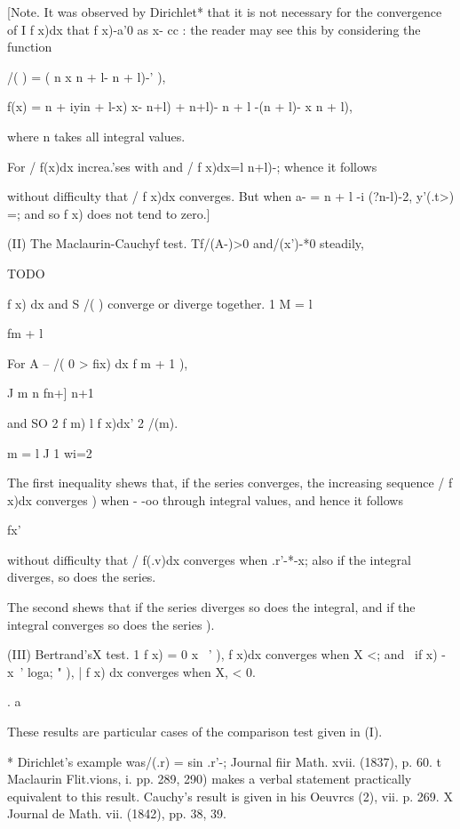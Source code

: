 [Note. It was observed by Dirichlet* that it is not necessary for the
convergence of I f x)dx that f x)-a'0 as x- cc : the reader may see
this by considering the function

/( ) = ( n x n + l- n + l)-' ),

f(x) = n + iyin + l-x) x- n+l) + n+l)- n + l -(n + l)- x n + l),

where n takes all integral values.

For / f(x)dx increa.'ses with and / f x)dx=l n+l)-; whence it follows

without difficulty that / f x)dx converges. But when a- = n + l -i
(?n-l)-2, y'(.t>) =; and so f x) does not tend to zero.]

(II) The Maclaurin-Cauchyf test. Tf/(A-)>0 and/(x')-*0 steadily,

TODO

f x) dx and S /( ) converge or diverge together. 1 M = l

fm + l

For A -- /( 0 > fix) dx f m + 1 ),

J m n fn+] n+1

and SO 2 f m) l f x)dx' 2 /(m).

  m = l J 1 wi=2

The first inequality shews that, if the series converges, the
increasing sequence / f x)dx converges ) when - -oo through
integral values, and hence it follows

fx'

without difficulty that / f(.v)dx converges when .r'-*-x; also if the
integral diverges, so does the series.

The second shews that if the series diverges so does the integral, and
if the integral converges so does the series ).

(III) Bertrand'sX test. 1 f x) = 0 x ~' ), f x)dx converges when X <;
and \ if x) - x~' loga; " ), | f x) dx converges when X, < 0.

. a

These results are particular cases of the comparison test given in
(I).

* Dirichlet's example was/(.r) = sin .r'-; Journal fiir Math. xvii.
(1837), p. 60. t Maclaurin Flit.vions, i. pp. 289, 290) makes a verbal
statement practically equivalent to this result. Cauchy's result is
given in his Oeuvrcs (2), vii. p. 269. X Journal de Math. vii. (1842),
pp. 38, 39.

%
%

